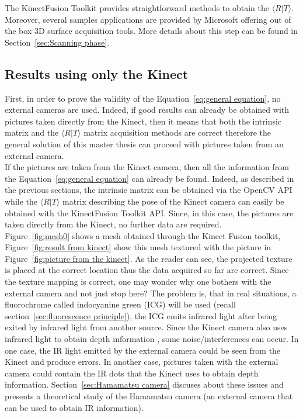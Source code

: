 The KinectFusion Toolkit provides straightforward methods to obtain the $\langle R\vert T\rangle$. Moreover, several samples applications are provided by Microsoft offering out of the box 3D surface acquisition tools. More details about this step can be found in Section~\ref{sec:Scanning phase}.

\subsection{Results using only the Kinect}
\label{sec:Results using only the Kinect}

First, in order to prove the validity of the Equation~\ref{eq:general equation}, no external cameras are used. Indeed, if good results can already be obtained with pictures taken directly from the Kinect, then it means that both the intrinsic matrix and the $\langle R\vert T\rangle$ matrix acquisition methods are correct therefore the general solution of this master thesis can proceed with pictures taken from an external camera.\\

If the pictures are taken from the Kinect camera, then all the information from the Equation~\ref{eq:general equation} can already be found. Indeed, as described in the previous sections, the intrinsic matrix can be obtained via the OpenCV API while the $\langle R\vert T\rangle$ matrix describing the pose of the Kinect camera can easily be obtained with the KinectFusion Toolkit API. Since, in this case, the pictures are taken directly from the Kinect, no further data are required. \\

Figure~\ref{fig:mesh0} shows a mesh obtained through the Kinect Fusion toolkit, Figure~\ref{fig:result from kinect} show this mesh textured with the picture in Figure~\ref{fig:picture from the kinect}. As the reader can see, the projected texture is placed at the correct location thus the data acquired so far are correct. Since the texture mapping is correct, one may wonder why one bothers with the external camera and not just stop here? The problem is, that in real situations, a fluorochrome called indocyanine green (ICG) will be used (recall section~\ref{sec:fluorescence principle}), the ICG emits infrared light after being exited by infrared light from another source. Since the Kinect camera also uses infrared light to obtain depth information \cite{freedman_depth_2008}, some noise/interferences can occur. In one case, the IR light emitted by the external camera could be seen from the Kinect and produce errors. In another case, pictures taken with the external camera could contain the IR dots that the Kinect uses to obtain depth information.  Section~\ref{sec:Hamamatsu camera} discuses about these issues and presents a theoretical study of the Hamamatsu camera (an external camera that can be used to obtain IR information). \\

